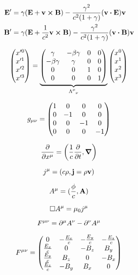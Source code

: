 \documentclass[11pt,twoside]{article}
\begin{document}
\begin{multicols}{3}
\begin{footnotesize}
\begin{equation}
\begin{split}
\vb{E'} &= \gamma(\vb{E} + \vb{v}\cross\vb{B}) - \frac{\gamma^2}{c^2(1+\gamma)}(\vb{v}\vdot\vb{E})\vb{v} \\
\vb{B'} &= \gamma(\vb{E} + \frac{1}{c^2}\vb{v}\cross\vb{B}) - \frac{\gamma^2}{c^2(1+\gamma)}(\vb{v}\vdot\vb{B})\vb{v}
\end{split}
\end{equation}

\begin{equation}
\mqty(x'^0 \\ x'^1 \\ x'^2 \\ x'^3) = \underbrace{\mqty(\gamma&-\beta\gamma&0&0 \\ -\beta\gamma&\gamma&0&0 \\ 0&0&1&0 \\ 0&0&0&1)}_{\Lambda\indices{^\mu_\nu}}\mqty(x^0 \\ x^1 \\ x^2 \\ x^3)
\end{equation}

\begin{equation}
g_{\mu\nu} = \mqty(\dmat[0]{1,-1,-1,-1})
\end{equation}

\begin{equation}
\pdv{x\indices{^\mu}} = \left(\frac{1}{c}\pdv{t}, \gradient \right)
\end{equation}

\begin{equation}
j\indices{^\mu} = (c\rho, \vb{j} = \rho \vb{v})
\end{equation}

\begin{equation}
A\indices{^\mu} = (\frac{\phi}{c}, \vb{A})
\end{equation}

\begin{equation}
\Box A\indices{^\mu} = \mu_0 j\indices{^\mu}
\end{equation}

\begin{equation}
F\indices{^{\mu\nu}} = \partial\indices{^\mu}A\indices{^\nu} - \partial\indices{^\nu}A\indices{^\mu} 
\end{equation}

\begin{equation}
F\indices{^{\mu\nu}} = \mqty(0&-\frac{E_x}{c}&-\frac{E_y}{c}&-\frac{E_z}{c} \\ \frac{E_x}{c}&0&-B_z&B_y \\ \frac{E_y}{c}&B_z&0&-B_x\\\frac{E_z}{c}&-B_y&B_x&0)
\end{equation}


\end{footnotesize}
\end{multicols}
\end{document}
